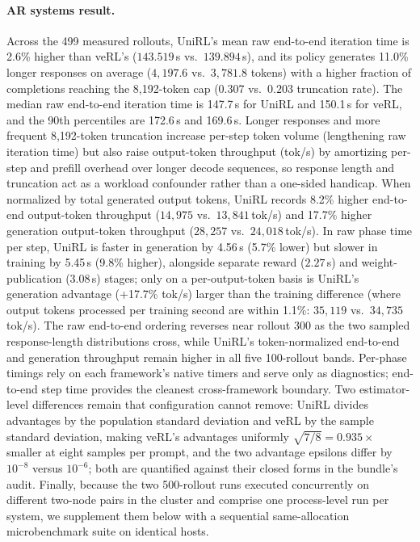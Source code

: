 \documentclass[10pt]{article}
\begin{document}
\paragraph{AR systems result.}
Across the 499 measured rollouts, UniRL's mean raw end-to-end iteration time is 2.6\% higher than veRL's ($143.519$\,s vs.\ $139.894$\,s), and its policy generates 11.0\% longer responses on average ($4{,}197.6$ vs.\ $3{,}781.8$ tokens) with a higher fraction of completions reaching the 8,192-token cap ($0.307$ vs.\ $0.203$ truncation rate).
The median raw end-to-end iteration time is 147.7\,s for UniRL and 150.1\,s for veRL, and the 90th percentiles are 172.6\,s and 169.6\,s.
Longer responses and more frequent 8,192-token truncation increase per-step token volume (lengthening raw iteration time) but also raise output-token throughput (tok/s) by amortizing per-step and prefill overhead over longer decode sequences, so response length and truncation act as a workload confounder rather than a one-sided handicap.
When normalized by total generated output tokens, UniRL records 8.2\% higher end-to-end output-token throughput ($14{,}975$ vs.\ $13{,}841$\,tok/s) and 17.7\% higher generation output-token throughput ($28{,}257$ vs.\ $24{,}018$\,tok/s).
In raw phase time per step, UniRL is faster in generation by 4.56\,s (5.7\% lower) but slower in training by 5.45\,s (9.8\% higher), alongside separate reward ($2.27$\,s) and weight-publication ($3.08$\,s) stages; only on a per-output-token basis is UniRL's generation advantage (+17.7\% tok/s) larger than the training difference (where output tokens processed per training second are within 1.1\%: $35{,}119$ vs.\ $34{,}735$\,tok/s).
The raw end-to-end ordering reverses near rollout 300 as the two sampled response-length distributions cross, while UniRL's token-normalized end-to-end and generation throughput remain higher in all five 100-rollout bands.
Per-phase timings rely on each framework's native timers and serve only as diagnostics; end-to-end step time provides the cleanest cross-framework boundary.
Two estimator-level differences remain that configuration cannot remove: UniRL divides advantages by the population standard deviation and veRL by the sample standard deviation, making veRL's advantages uniformly $\sqrt{7/8}=0.935\times$ smaller at eight samples per prompt, and the two advantage epsilons differ by $10^{-8}$ versus $10^{-6}$; both are quantified against their closed forms in the bundle's audit.
Finally, because the two 500-rollout runs executed concurrently on different two-node pairs in the cluster and comprise one process-level run per system, we supplement them below with a sequential same-allocation microbenchmark suite on identical hosts.
\end{document}
